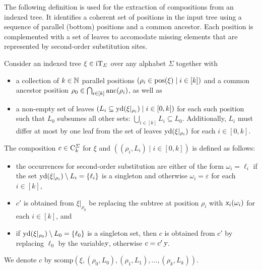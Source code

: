 \documentclass[../../document.tex]{subfiles}
\begin{document}
    The following definition is used for the extraction of  compositions from an indexed tree.
    It identifies a coherent set of positions in the input tree using a sequence of parallel (bottom) positions and a common ancestor.
    Each position is complemented with a set of leaves to accomodate missing elements that are represented by second-order substitution sites.

    \begin{definition}\label{def:dcp:comp}
        Consider an indexed tree \(\xi \in \operatorname{iT}_{\varSigma}\) over any alphabet \(\varSigma\) together with
        \begin{itemize}
            \item
                a collection of \(k \in \mathbb{N}\) parallel positions \((\rho_i \in \operatorname{pos}(\xi) \mid i \in [k])\) and
                a common ancestor position \(\rho_0 \in \bigcap_{i \in [k]} \operatorname{anc}(\rho_i)\), as well as
            \item
                a non-empty set of leaves \((L_i \subseteq \operatorname{yd}(\xi|_{\rho_i}) \mid i \in [0, k])\) for each such position such that
                \(L_0\) subsumes all other sets: \(\bigcup_{i\in[k]} L_i \subseteq L_0\). Additionally, \(L_i\) must differ at most by one leaf from the set of leaves \(\operatorname{yd}(\xi|_{\rho_i})\) for each \(i \in [0,k]\).
        \end{itemize}

        The  composition \(c \in \mathrm{C}^\varSigma_k\) for \(\xi\) and \(((\rho_i, L_i) \mid i \in [0,k])\) is defined as follows:
        \begin{itemize}
            \item
                the occurrences for second-order substitution are either of the form \(\omega_i = \ell_i\) if the set \(\operatorname{yd}(\xi|_{\rho_i}) \setminus L_i = \{\ell_i\}\) is a singleton and otherwise \(\omega_i = \varepsilon\) for each \(i \in [k]\),
            \item
                \(c'\) is obtained from \(\xi|_{\rho_0}\) be replacing the subtree at position
                \(\rho_i\) with \(\textsl{x}_i(\omega_i)\) for each \(i \in [k]\), and
            \item
                if \(\operatorname{yd}(\xi|_{\rho_0}) \setminus L_0 = \{\ell_0\}\) is a singleton set,
                then \(c\) is obtained from \(c'\) by replacing \(\ell_0\) by the variable\(\textsl{y}\), otherwise \(c = c' \, \textsl{y}\).
        \end{itemize}
        We denote \(c\) by \(\mathrm{scomp}(\xi, (\rho_0, L_0), (\rho_1, L_1), \ldots, (\rho_k, L_k))\).
    \end{definition}
\end{document}
